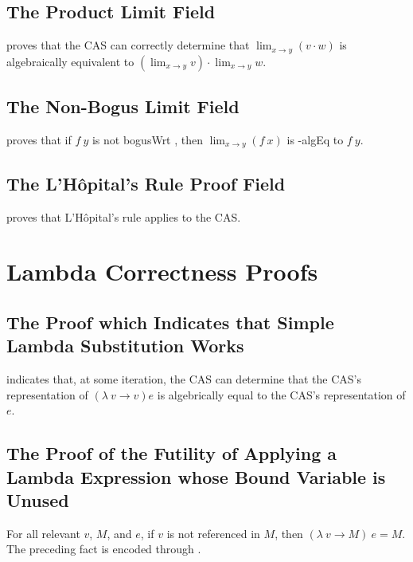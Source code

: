 \documentclass{report}
\begin{document}
\subsection{The Product Limit Field}
  proves that the  CAS can correctly determine that \(\lim_{x \rightarrow y} \left(v \cdot w\right)\) is algebraically equivalent to \(\left(\lim_{x \rightarrow y} v\right) \cdot \lim_{x \rightarrow y} w\).

\subsection{The Non-Bogus Limit Field}
  proves that if \(f\ y\) is not \gls{bogusWrt} , then \(\lim_{x \rightarrow y} \left(f\ x\right)\) is -\gls{algEq} to \(f\ y\).

\subsection{The L'H\^opital's Rule Proof Field}
  proves that L'H\^opital's rule applies to the  CAS.

\section{Lambda Correctness Proofs}

\subsection{The Proof which Indicates that Simple Lambda Substitution Works}
  indicates that, at some iteration, the  CAS can determine that the  CAS's representation of \(\left(\lambda\ v \rightarrow v\right) e\) is algebrically equal to the  CAS's representation of \(e\).

\subsection{The Proof of the Futility of Applying a Lambda Expression whose Bound Variable is Unused}
For all relevant \(v\), \(M\), and \(e\), if \(v\) is not referenced in \(M\), then \(\left(\lambda\ v \rightarrow M\right)\ e = M\).  The preceding fact is encoded through .
\end{document}
